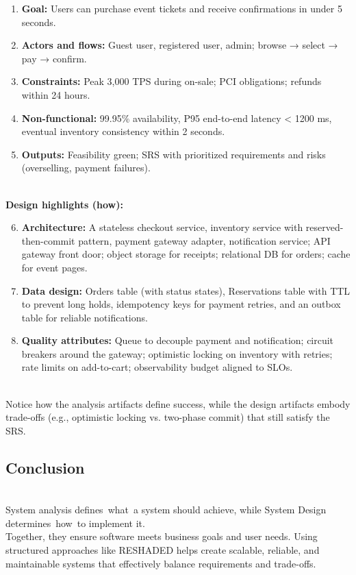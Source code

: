 \begin{enumerate}
\item
\protect{}\label{VAmisbwMik5XrEd0Hqzt4}
\textbf{Goal:} Users can purchase event tickets and receive confirmations in under 5 seconds.
\item
\protect{}\label{hVyNf8h-P_FqxbaTRDeZF}
\textbf{Actors and flows:} Guest user, registered user, admin; browse → select → pay → confirm.
\item
\protect{}\label{3Ol766LIwEBBqZX4D9qB_}
\textbf{Constraints:} Peak 3,000 TPS during on-sale; PCI obligations; refunds within 24 hours.
\item
\protect{}\label{d752IPwqvmkna0ezHD8s8}
\textbf{Non-functional:} 99.95\% availability, P95 end-to-end latency \textless{} 1200 ms, eventual inventory consistency within 2 seconds.
\item
\protect{}\label{g7O-MY0HnAvTMOv5W_xuC}
\textbf{Outputs:} Feasibility green; SRS with prioritized requirements and risks (overselling, payment failures).
\end{enumerate}
\\
\textbf{Design highlights (how):}

\begin{enumerate}
\setcounter{enumi}{5}
\item
\protect{}\label{ZW8twNd47rxHyA8Cdma0D}
\textbf{Architecture:} A stateless checkout service, inventory service with reserved-then-commit pattern, payment gateway adapter, notification service; API gateway front door; object storage for receipts; relational DB for orders; cache for event pages.
\item
\protect{}\label{Qi7-IjlVUKfqJUkAmfrOC}
\textbf{Data design:} Orders table (with status states), Reservations table with TTL to prevent long holds, idempotency keys for payment retries, and an outbox table for reliable notifications.
\item
\protect{}\label{jJNZ9kLF4VI-hFpFVP4nW}
\textbf{Quality attributes:} Queue to decouple payment and notification; circuit breakers around the gateway; optimistic locking on inventory with retries; rate limits on add-to-cart; observability budget aligned to SLOs.
\end{enumerate}
\\
Notice how the analysis artifacts define success, while the design artifacts embody trade-offs (e.g., optimistic locking vs. two-phase commit) that still satisfy the SRS.

\subsection{Conclusion}\label{1SF0Wi-nZcrQcqk75ZRbZ}
\\
System analysis defines~what~a system should achieve, while System Design determines~how~to implement it.
\\
Together, they ensure software meets business goals and user needs. Using structured approaches like RESHADED helps create scalable, reliable, and maintainable systems that effectively balance requirements and trade-offs.

